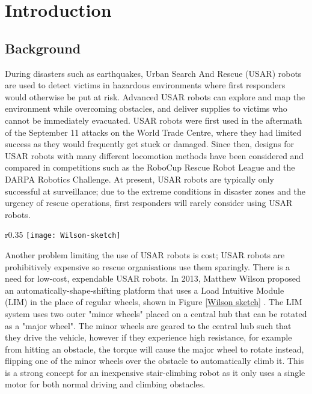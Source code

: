 \chapter{Introduction}

\section{Background}

During disasters such as earthquakes, Urban Search And Rescue (USAR) robots are used to detect victims in hazardous environments where first responders would otherwise be put at risk. Advanced USAR robots can explore and map the environment while overcoming obstacles, and deliver supplies to victims who cannot be immediately evacuated. USAR robots were first used in the aftermath of the September 11 attacks on the World Trade Centre, where they had limited success as they would frequently get stuck or damaged. Since then, designs for USAR robots with many different locomotion methods have been considered and compared in competitions such as the RoboCup Rescue Robot League and the DARPA Robotics Challenge. At present, USAR robots are typically only successful at surveillance; due to the extreme conditions in disaster zones and the urgency of rescue operations, first responders will rarely consider using USAR robots.\\

\begin{wrapfigure}{r}{0.35\textwidth} %
	\centering
	\texttt{[image: Wilson-sketch]}
	\caption{Systems layout of Wilson's LIM device \citep{Wilson-2013}.}
	\label{Wilson sketch}
\end{wrapfigure}

\noindent Another problem limiting the use of USAR robots is cost; USAR robots are prohibitively expensive so rescue organisations use them sparingly. There is a need for low-cost, expendable USAR robots. In 2013, Matthew Wilson proposed an automatically-shape-shifting platform that uses a Load Intuitive Module (LIM) in the place of regular wheels, shown in Figure \ref{Wilson sketch} \citep{Wilson-2013}. The LIM system uses two outer "minor wheels" placed on a central hub that can be rotated as a "major wheel". The minor wheels are geared to the central hub such that they drive the vehicle, however if they experience high resistance, for example from hitting an obstacle, the torque will cause the major wheel to rotate instead, flipping one of the minor wheels over the obstacle to automatically climb it. This is a strong concept for an inexpensive stair-climbing robot as it only uses a single motor for both normal driving and climbing obstacles.\\




